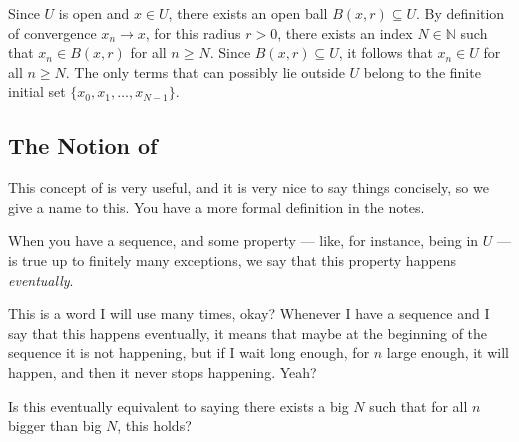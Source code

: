 \begin{content}
\begin{center}
\end{center}

\begin{steps}
Since $U$ is open and $x \in U$, there exists an open ball $B(x, r) \subseteq U$. By definition of convergence $x_n \to x$, for this radius $r > 0$, there exists an index $N \in \mathbb{N}$ such that $x_n \in B(x, r)$ for all $n \ge N$. Since $B(x, r) \subseteq U$, it follows that $x_n \in U$ for all $n \ge N$. The only terms that can possibly lie outside $U$ belong to the finite initial set $\{x_0, x_1, \dots, x_{N-1}\}$.
\end{steps}
\end{content}

\subsection{The Notion of \texorpdfstring{}{Eventually}}

\begin{speech}[00:38:59 - 00:39:59]
This concept of  is very useful, and it is very nice to say things concisely, so we give a name to this. You have a more formal definition in the notes.

When you have a sequence, and some property --- like, for instance, being in $U$ --- is true up to finitely many exceptions, we say that this property happens \emph{eventually}. 

This is a word I will use many times, okay? Whenever I have a sequence and I say that this happens eventually, it means that maybe at the beginning of the sequence it is not happening, but if I wait long enough, for $n$ large enough, it will happen, and then it never stops happening. Yeah? 
\end{speech}

\begin{student}
Is this eventually equivalent to saying there exists a big $N$ such that for all $n$ bigger than big $N$, this holds?
\end{student}

